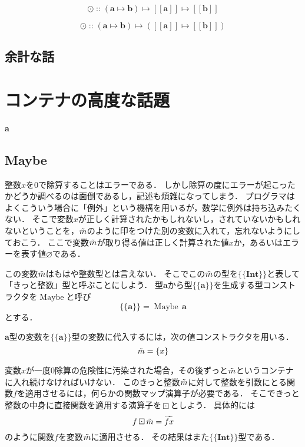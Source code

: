 \documentclass[twocolumn]{jsbook}
\def\[{[\![}
\def\]{]\!]}
\newcommand{\hsklType}[1]{\textbf{#1}}
\newcommand{\hsklTypeConstructor}[1]{\mathop{\mathrm{#1}}}
\DeclareMathOperator{\hsklMaybeConstructor}{\hsklTypeConstructor{Maybe}}
\DeclareMathOperator{\hsklMaybeMap}{\boxdot}
\DeclareMathOperator{\hsklOf}{::}
\newcommand{\hsklInt}{\hsklType{Int}}
\newcommand{\hsklMap}{\odot}
\newcommand{\hsklNothing}{\varnothing}
\newcommand{\hsklJust}[1]{\{#1\}}
\newcommand{\hsklListType}[1]{\[#1\]}
\newcommand{\hsklMaybe}[1]{\Tilde{#1}}
\newcommand{\hsklMaybeW}[1]{\widetilde{#1}}
\newcommand{\hsklMaybeType}[1]{\{\!\{#1\}\!\}}
\newcommand{\hsklTypeConstruct}[2]{#1\,#2}
\DeclareMathOperator{\mathMapsTo}{\mapsto}
\newcommand{\mathMorph}[2]{#1\mathMapsTo#2}
\newcommand{\mathMorphII}[3]{#1\mathMapsTo#2\mathMapsTo#3}
\newenvironment{leader}{\begingroup\bf}{\endgroup}
\newcommand{\typename}[1]{\mathbf{#1}}
\newcommand{\typeconstructor}[2]{\mathop{#1}\,#2}
\newcommand{\typeint}{\typename{Int}}
\newcommand{\typemaybe}{\typename{Maybe}}
\newcommand{\binarymaybefunctormap}{\boxdot}
\newcommand{\maybetype}[1]{\left\{#1\right\}}
\begin{document}
$$\hsklMap\hsklOf{}\mathMorphII{(\mathMorph{\hsklType{a}}{\hsklType{b}})}{\hsklListType{\hsklType{a}}}{\hsklListType{\hsklType{b}}}$$

$$\hsklMap\hsklOf{}\mathMorph{(\mathMorph{\hsklType{a}}{\hsklType{b}})}{(\mathMorph{\hsklListType{\hsklType{a}}}{\hsklListType{\hsklType{b}}})}$$


\section*{余計な話}

\chapter{コンテナの高度な話題}

\begin{leader}
a
\end{leader}


\section{Maybe}

整数$x$を$0$で除算することはエラーである．
しかし除算の度にエラーが起こったかどうか調べるのは面倒であるし，記述も煩雑になってしまう．
プログラマはよくこういう場合に「例外」という機構を用いるが，数学に例外は持ち込みたくない．
そこで変数$x$が正しく計算されたかもしれないし，されていないかもしれないということを，$\hsklMaybe{m}$のように印をつけた別の変数に入れて，忘れないようにしておこう．
ここで変数$\hsklMaybe{m}$が取り得る値は正しく計算された値$x$か，あるいはエラーを表す値$\hsklNothing$である．

この変数$\hsklMaybe{m}$はもはや整数型とは言えない．
そこでこの$\hsklMaybe{m}$の型を$\hsklMaybeType{\hsklInt}$と表して「きっと整数」型と呼ぶことにしよう．
型$\hsklType{a}$から型$\hsklMaybeType{\hsklType{a}}$を生成する型コンストラクタを$\hsklMaybeConstructor$と呼び$$\hsklMaybeType{\hsklType{a}}=\hsklTypeConstruct{\hsklMaybeConstructor}{\hsklType{a}}$$とする．

$\hsklType{a}$型の変数を$\hsklMaybeType{\hsklType{a}}$型の変数に代入するには，次の値コンストラクタを用いる．
$$\hsklMaybe{m}=\hsklJust{x}$$

変数$x$が一度$0$除算の危険性に汚染された場合，その後ずっと$\hsklMaybe{m}$というコンテナに入れ続けなければいけない．
このきっと整数$\hsklMaybe{m}$に対して整数を引数にとる関数$f$を適用させるには，何らかの関数マップ演算子が必要である．
そこできっと整数の中身に直接関数を適用する演算子を$\hsklMaybeMap$としよう．
具体的には$$f\hsklMaybeMap\hsklMaybe{m}=\hsklMaybeW{fx}$$のように関数$f$を変数$\hsklMaybe{m}$に適用させる．
その結果はまた$\hsklMaybeType{\hsklInt}$型である．
\end{document}
